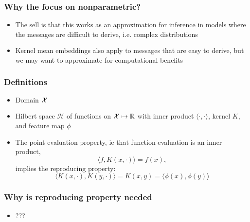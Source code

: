 \documentclass{beamer}
\begin{document}
\begin{frame}
\frametitle{Why the focus on nonparametric?}
\begin{itemize}
\item The sell is that this works as an approximation for inference in models
    where the messages are difficult to derive, i.e. complex distributions
\vspace{2em}
\item Kernel mean embeddings also apply to messages that are easy to derive,
    but we may want to approximate for computational benefits
\end{itemize}
\end{frame}

\begin{frame}
\frametitle{Definitions}
\begin{itemize}
\item Domain $\mathcal{X}$
\vspace{1em}
\item Hilbert space $\mathscr{H}$ of functions on $\mathcal{X}\mapsto\mathbb{R}$
    with inner product $\langle\cdot,\cdot\rangle$, kernel $K$,
    and feature map $\phi$
\vspace{1em}
\item The point evaluation property, 
ie that function evaluation is an inner product,
$$\langle f, K(x, \cdot) \rangle = f(x),$$
implies the reproducing property:
$$ \langle K(x,\cdot), K(y, \cdot) \rangle = K(x,y) = \langle \phi(x), \phi(y) \rangle$$
\end{itemize}
\end{frame}

\begin{frame}
\frametitle{Why is reproducing property needed}
\begin{itemize}
\item ???
\end{itemize}
\end{frame}
\end{document}

